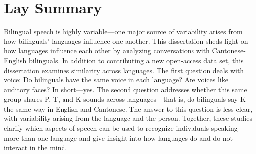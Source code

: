 
\chapter{Lay Summary}

Bilingual speech is highly variable---one major source of variability arises from how bilinguals' languages influence one another. This dissertation sheds light on how languages influence each other by analyzing conversations with Cantonese-English bilinguals. In addition to contributing a new open-access data set, this dissertation examines similarity across languages. The first question deals with voice: Do bilinguals have the same voice in each language? Are voices like auditory faces? In short---yes. The second question addresses whether this same group shares P, T, and K sounds across languages---that is, do bilinguals say K the same way in English and Cantonese. The answer to this question is less clear, with variability arising from the language and the person. Together, these studies clarify which aspects of speech can be used to recognize individuals speaking more than one language and give insight into how languages do and do not interact in the mind. 
 

\endinput %
